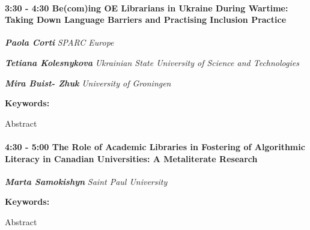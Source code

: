 \documentclass[
]{book}
\begin{document}
\begin{session}
\hypertarget{becoming-oe-librarians-in-ukraine-during-wartime-taking-down-language-barriers-and-practising-inclusion-practice}{%
\paragraph*{\texorpdfstring{3:30 - 4:30 \textbar{} \textbf{Be(com)ing OE
Librarians in Ukraine During Wartime: Taking Down Language Barriers and
Practising Inclusion} \textbar{}
Practice}{3:30 - 4:30 \textbar{} Be(com)ing OE Librarians in Ukraine During Wartime: Taking Down Language Barriers and Practising Inclusion \textbar{} Practice}}\label{becoming-oe-librarians-in-ukraine-during-wartime-taking-down-language-barriers-and-practising-inclusion-practice}}

\textbf{\emph{Paola Corti}} \textbar{} \emph{SPARC Europe}

\textbf{\emph{Tetiana Kolesnykova}} \textbar{} \emph{Ukrainian State
University of Science and Technologies}

\textbf{\emph{Mira Buist- Zhuk}} \textbar{} \emph{University of
Groningen}

\textbf{Keywords:}

Abstract
\end{session}

\begin{session}
\hypertarget{the-role-of-academic-libraries-in-fostering-of-algorithmic-literacy-in-canadian-universities-a-metaliterate-research}{%
\paragraph*{\texorpdfstring{4:30 - 5:00 \textbar{} \textbf{The Role of
Academic Libraries in Fostering of Algorithmic Literacy in Canadian
Universities: A Metaliterate} \textbar{}
Research}{4:30 - 5:00 \textbar{} The Role of Academic Libraries in Fostering of Algorithmic Literacy in Canadian Universities: A Metaliterate \textbar{} Research}}\label{the-role-of-academic-libraries-in-fostering-of-algorithmic-literacy-in-canadian-universities-a-metaliterate-research}}

\textbf{\emph{Marta Samokishyn}} \textbar{} \emph{Saint Paul University}

\textbf{Keywords:}

Abstract
\end{session}
\end{document}
